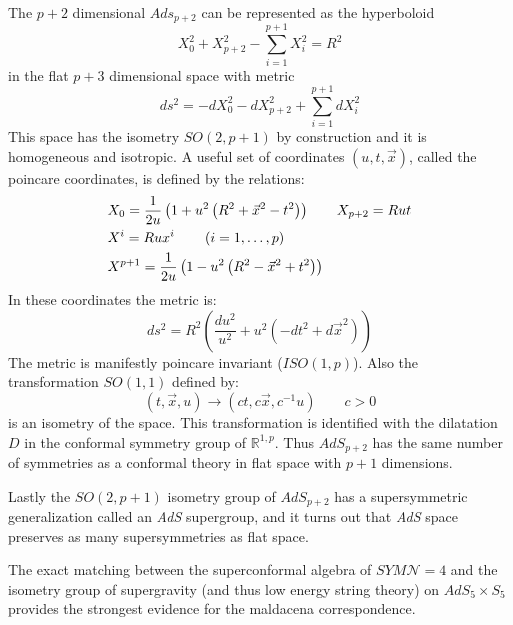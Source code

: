 \documentclass[11pt,a4paper]{article}
\begin{document}
The $p+2$ dimensional $Ads_{p+2}$ can be represented as the hyperboloid
\begin{equation}
X_0^2+X_{p+2}^2-\sum_{i=1}^{p+1}X_i^2=R^2
\end{equation} 
in the flat $p+3$ dimensional space with metric
\begin{equation}
ds^2=-dX_0^2-dX_{p+2}^2+\sum_{i=1}^{p+1}dX_i^2
\end{equation}
This space has the isometry $SO(2,p+1)$ by construction and it is homogeneous and isotropic. A useful set of coordinates $(u,t,\vec{x})$, called the poincare coordinates, is defined by the relations:
\begin{align}
&X_0=\frac{1}{2u}\left(1+u^2 \left(R^2+\vec{x}^2-t^2\right)\right) &X_{p+2}=Rut \notag \\
&X^i=Rux^i \qquad \left(i=1,\hdots,p\right) \notag \\
&X^{p+1}=\frac{1}{2u}\left(1-u^2 \left(R^2-\vec{x}^2+t^2\right)\right)
\end{align}
In these coordinates the metric is:
\begin{equation}
ds^2=R^2\left(\frac{du^2}{u^2}+u^2\left(-dt^2+d\vec{x}^2\right)\right)
\end{equation}
The metric is manifestly poincare invariant ($ISO\left(1,p\right)$). Also the transformation $SO\left(1,1\right)$ defined by:
\begin{equation}
\left(t,\vec{x},u\right)\rightarrow \left(ct,c\vec{x},c^{-1}u\right)\qquad c>0
\end{equation}
is an isometry of the space. This transformation is identified with the dilatation $D$ in the conformal symmetry group of $\mathbb{R}^{1,p}$. Thus $AdS_{p+2}$ has the same number of symmetries as a conformal theory in flat space with $p+1$ dimensions.

Lastly the $SO\left(2,p+1\right)$ isometry group of $AdS_{p+2}$ has a supersymmetric generalization called an \textit{AdS} supergroup, and it turns out that \textit{AdS} space preserves as many supersymmetries as flat space.

The exact matching between the superconformal algebra of $SYM\mathcal{N}=4$ and the isometry group of supergravity (and thus low energy string theory) on $AdS_5\times S_5$ provides the strongest evidence for the maldacena correspondence.
\end{document}
